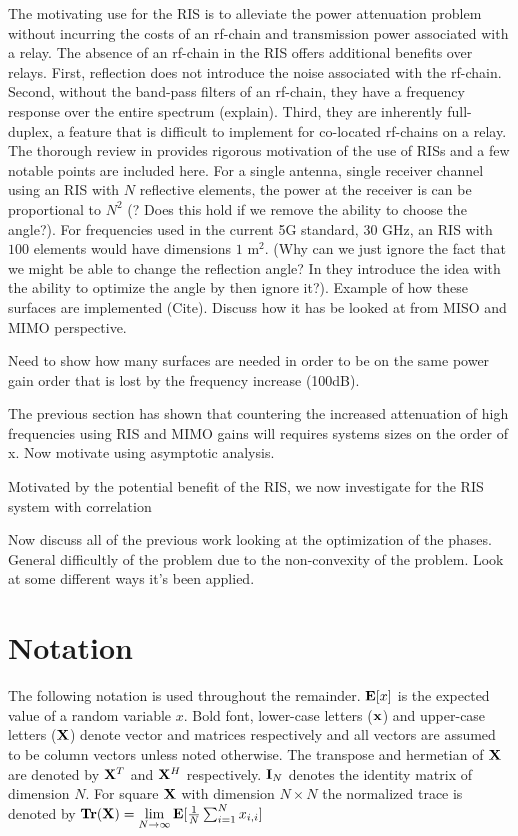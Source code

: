 \documentclass[12pt,a4paper]{report}
\begin{document}
The motivating use for the RIS is to alleviate the power attenuation problem without incurring the costs of an rf-chain and transmission power 
associated with a relay. The absence of an rf-chain in the RIS offers additional benefits over relays. First, reflection does not introduce the noise associated with the rf-chain. Second, without the band-pass filters of an rf-chain, they have a frequency response over the entire spectrum (explain). Third, they are inherently full-duplex, a feature that is difficult to implement for co-located rf-chains on a relay. 
The thorough review in \cite{basar2019wireless} provides rigorous motivation of the use of RISs and a few notable points are included here.
For a single antenna, single receiver channel using an RIS with $N$ reflective elements, the power at the receiver is can be proportional to $N^2$ (? Does this hold if we remove the ability to choose the angle?).
For frequencies used in the current 5G standard, 30 GHz, an RIS with $100$ elements would have dimensions $1$ $\text{m}^2$.
(Why can we just ignore the fact that we might be able to change the reflection angle? In \cite{basar2019wireless} they introduce the idea with the ability to optimize the angle by then ignore it?).
Example of how these surfaces are implemented (Cite).
Discuss how it has be looked at from MISO and MIMO perspective.
\par
Need to show how many surfaces are needed in order to be on the same power gain order that is lost by the frequency increase (100dB).
\par
The previous section has shown that countering the increased attenuation of high frequencies using RIS and MIMO gains will requires systems 
sizes on the order of x. Now motivate using asymptotic analysis.
\par

\par
Motivated by the potential benefit of the RIS, we now investigate for the RIS system with correlation

\par
Now discuss all of the previous work looking at the optimization of the phases. 
General difficultly of the problem due to the non-convexity of the problem. Look at some different ways it's been applied.

\section{Notation}
The following notation is used throughout the remainder. 
$\mathop{\bf E{}}[x]$ is the expected value of a random variable $x$.
Bold font, lower-case letters ($\mathbf{x}$) and upper-case letters ($\mathbf{X}$) denote vector and matrices respectively and all vectors are assumed to be column vectors unless noted otherwise. 
The transpose and hermetian of $\mathbf{X}$ are denoted by $\mathbf{X}^T$ and $\mathbf{X}^H$ respectively.
$\mathbf{I}_N$ denotes the identity matrix of dimension $N$.
For square $\mathbf{X}$ with dimension $N\times N$ the normalized trace is denoted by $\mathop{\bf Tr}(\mathbf{X})  = \underset{N \rightarrow \infty}{\text{lim}}
\mathop{\bf E{}}[\frac{1}{N}\sum_{i=1}^N x_{i,i}]$
\end{document}
